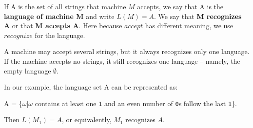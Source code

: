 If A is the set of all strings that machine \(M\) accepts, we say that A is the \textbf{language of machine M} and write \(L(M) = A\).   
We say that \textbf{M recognizes A} or that \textbf{M accepts A}.     
Here because \(accept\) has different meaning, we use \(recognize\) for the language.  

\begin{remark}
    A machine may accept several strings, but it always recognizes only one language.
    If the machine accepts no strings, it still recognizes one language -- namely, the empty language \(\emptyset\). 
\end{remark}

\begin{eg}
    In our example, the language set A can be represented as:

    A = \{\(\omega\)|\(\omega\) contains at least one \verb|1| and an even number of \verb|0|s follow the last \verb|1|\}.

    Then \(L(M_1) = A\), or equivalently, \(M_1\) recognizes \(A\).   
\end{eg}
